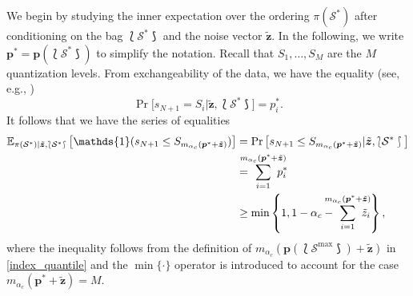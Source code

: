 \documentclass[12pt, draftclsnofoot, onecolumn]{IEEEtran}
\begin{document}
We begin by studying the inner expectation over the ordering $\pi(\mathcal{S}^*)$ after conditioning on the bag $\lbag \mathcal{S}^* \rbag$ and the noise vector $\tilde{\boldsymbol{z}}$. In the following, we write $\boldsymbol{p}^*=\boldsymbol{p}(\lbag \mathcal{S}^* \rbag)$ to simplify the notation.  Recall that $S_1,\ldots,S_M$ are the $M$ quantization levels. From exchangeability of the data, we have the equality (see, e.g., \cite{tibshirani2019conformal})
\begin{equation}\label{s_N1}
    \Pr\big[s_{N+1}=S_i|\tilde{\boldsymbol{z}}, \lbag \mathcal{S}^*\rbag \big]=p^*_i.
\end{equation}
It follows that we have the series of equalities
\begin{align}
    \mathbb{E}_{\pi(\mathcal{S}^*)|\tilde{\boldsymbol{z}},\lbag \mathcal{S}^* \rbag}\left[\mathds{1}(s_{N+1}\leq S_{m_{\alpha_c}(\boldsymbol{p}^*+\tilde{\boldsymbol{z}})})\right]&=\Pr\big[s_{N+1}\leq S_{m_{\alpha_c}(\boldsymbol{p}^*+\tilde{\boldsymbol{z}})}|\tilde{\boldsymbol{z}}, \lbag \mathcal{S}^*\rbag \big]\nonumber\\
    &=\hspace{-1em}\sum^{m_{\alpha_c}(\boldsymbol{p}^*+\tilde{\boldsymbol{z}})}_{i=1}\hspace{-1em}p^*_i\nonumber\\
    &\geq \min \left\{1,1-\alpha_c -\hspace{-1em}\sum^{m_{\alpha_c}(\boldsymbol{p}^*+\tilde{\boldsymbol{z}})}_{i=1}\hspace{-1em}\tilde{z}_i\right\},
\end{align}
where the inequality follows from the definition of $m_{\alpha_c}(\boldsymbol{p}(\lbag\mathcal{S}^{\text{max}}\rbag)+\tilde{\boldsymbol{z}})$ in \eqref{index_quantile} and the $\min\{\cdot\}$ operator is introduced to account for the case $m_{\alpha_c}(\boldsymbol{p}^*+\tilde{\boldsymbol{z}})=M$.
\end{document}
